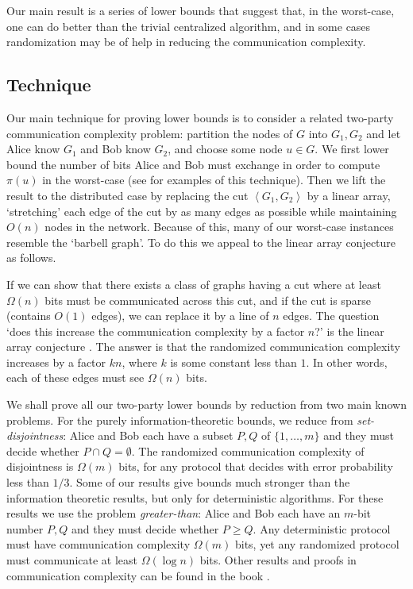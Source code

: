 \documentclass[twocolumn]{article}
\begin{document}
Our main result is a series of lower bounds that suggest that, in the worst-case, one can do better than the trivial centralized algorithm, and in some cases randomization may be of help in reducing the communication complexity.

\subsection{Technique}
\label{sec:technique}

Our main technique for proving lower bounds is to consider a related two-party
communication complexity problem: partition the nodes of $G$ into $G_1,G_2$ and let Alice know $G_1$ and Bob know $G_2$, and choose some node $u \in G$. We first lower bound the number of bits Alice and Bob must exchange in order to compute $\pi(u)$ in the worst-case (see \cite{nisan97communication} for examples of this technique). Then we lift the result to the distributed case by replacing the cut $\left< G_1,G_2 \right>$ by a linear array, `stretching' each edge of the cut by as many edges as possible while maintaining $O(n)$ nodes in the network. Because of this, many of our worst-case instances resemble the `barbell graph'. To do this we appeal to the linear array conjecture \cite{237817,258622} as follows.

If we can show that there exists a class of graphs having a cut where at least $\Omega(n)$ bits must be communicated across this cut, and if the cut is sparse (contains $O(1)$ edges), we can replace it by a line of $n$ edges. The question `does this increase the communication complexity by a factor $n$?' is the linear array conjecture \cite{237817}. The answer is that the randomized communication complexity increases by a factor $kn$, where $k$ is some constant less than $1$. In other words, each of these edges must see $\Omega(n)$ bits.

We shall prove all our two-party lower bounds by reduction from two main known problems. For the purely information-theoretic bounds, we reduce from {\em set-disjointness}: Alice and Bob each have a subset $P,Q$ of $\{1,\ldots,m\}$ and they must decide whether $P \cap Q = \emptyset$. The randomized communication complexity of disjointness is $\Omega(m)$ bits, for any protocol that decides with error probability less than $1/3$. Some of our results give bounds much stronger than the information theoretic results, but only for deterministic algorithms. For these results we use the problem {\em greater-than}: Alice and Bob each have an $m$-bit number $P,Q$ and they must decide whether $P \geq Q$. Any deterministic protocol must have communication complexity $\Omega(m)$ bits, yet any randomized protocol must communicate at least $\Omega(\log n)$ bits. Other results and proofs in communication complexity can be found in the book \cite{nisan97communication}.
\end{document}

